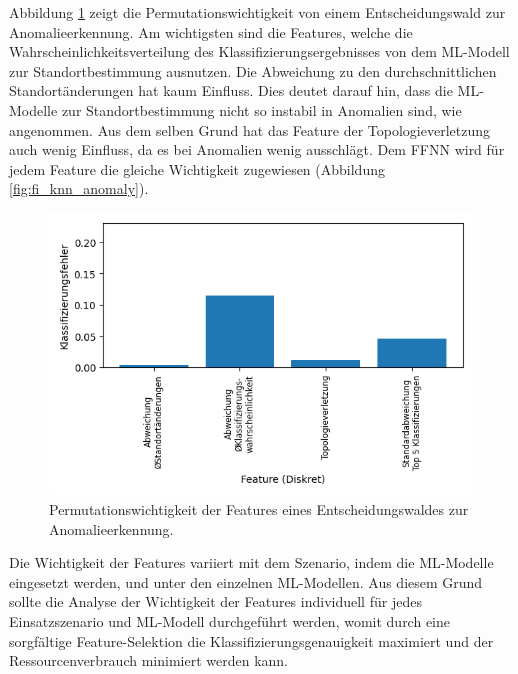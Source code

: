 \newpage
Abbildung \ref{fig:feature_significance_dt_anomaly} zeigt die Permutationswichtigkeit von einem Entscheidungswald zur Anomalieerkennung.
Am wichtigsten sind die Features, welche die Wahrscheinlichkeitsverteilung des Klassifizierungsergebnisses von dem ML-Modell zur Standortbestimmung ausnutzen.
Die Abweichung zu den durchschnittlichen Standortänderungen hat kaum Einfluss.
Dies deutet darauf hin, dass die ML-Modelle zur Standortbestimmung nicht so instabil in Anomalien sind, wie angenommen.
Aus dem selben Grund hat das Feature der Topologieverletzung auch wenig Einfluss, da es bei Anomalien wenig ausschlägt.
Dem FFNN wird für jedem Feature die gleiche Wichtigkeit zugewiesen (Abbildung \ref{fig:fi_knn_anomaly}).
\begin{figure}[h!]
    \centering
    \includegraphics[width=0.65\linewidth]{images/fi_anomaly_dt.png}
    \caption{Permutationswichtigkeit der Features eines Entscheidungswaldes zur Anomalieerkennung.}
    \label{fig:feature_significance_dt_anomaly}
\end{figure}
\newline
\newline
Die Wichtigkeit der Features variiert mit dem Szenario, indem die ML-Modelle eingesetzt werden, und unter den einzelnen ML-Modellen.
Aus diesem Grund sollte die Analyse der Wichtigkeit der Features individuell für jedes Einsatzszenario und ML-Modell durchgeführt werden,
womit durch eine sorgfältige Feature-Selektion die Klassifizierungsgenauigkeit maximiert und der Ressourcenverbrauch minimiert werden kann.